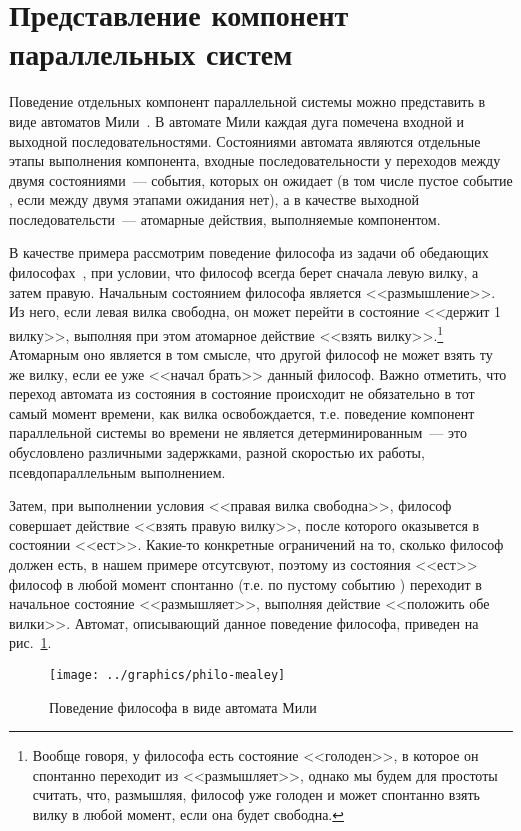 \section{Представление компонент параллельных систем}
\label{sec:mealey-formalization}

Поведение отдельных компонент параллельной системы можно представить в виде автоматов
Мили~\cite{Velder}. В автомате Мили каждая дуга помечена входной и выходной
последовательностями. Состояниями автомата являются отдельные этапы выполнения компонента,
входные последовательности у переходов между двумя состояниями~--- события, которых он
ожидает (в том числе пустое событие , если между двумя этапами ожидания нет),
а в качестве выходной последовательсти~--- атомарные действия, выполняемые компонентом.

В качестве примера рассмотрим поведение философа из задачи об обедающих
философах~\cite{Dijkstra}, при условии, что философ всегда берет сначала левую вилку, а
затем правую. Начальным состоянием философа является <<размышление>>. Из него, если левая
вилка свободна, он может перейти в состояние <<держит 1 вилку>>, выполняя при этом
атомарное действие <<взять вилку>>.\footnote{Вообще говоря, у философа есть состояние
  <<голоден>>, в которое он спонтанно переходит из <<размышляет>>, однако мы будем для
  простоты считать, что, размышляя, философ уже голоден и может спонтанно взять вилку в
  любой момент, если она будет свободна.} Атомарным оно является в том смысле, что другой
философ не может взять ту же вилку, если ее уже <<начал брать>> данный философ. Важно
отметить, что переход автомата из состояния в состояние происходит не обязательно в тот
самый момент времени, как вилка освобождается, т.е. поведение компонент параллельной
системы во времени не является детерминированным~--- это обусловлено различными задержками,
разной скоростью их работы, псевдопараллельным выполнением\etc.

Затем, при выполнении условия <<правая вилка свободна>>, философ совершает действие
<<взять правую вилку>>, после которого оказывется в состоянии <<ест>>. Какие-то конкретные
ограничений на то, сколько философ должен есть, в нашем примере отсутсвуют, поэтому из
состояния <<ест>> философ в любой момент спонтанно (т.е. по пустому событию )
переходит в начальное состояние <<размышляет>>, выполняя действие <<положить обе
вилки>>. Автомат, описывающий данное поведение философа, приведен на рис.~\ref{fig:philo-mealey}.

\begin{figure}[ht]
  \centering
  \texttt{[image: ../graphics/philo-mealey]}
  \caption{Поведение философа в виде автомата Мили}
  \label{fig:philo-mealey}
\end{figure}


